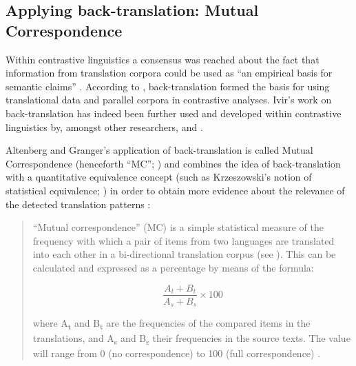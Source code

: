 \subsection{Applying back-translation: Mutual Correspondence}
\label{sec:2.3.3}  
Within contrastive linguistics a consensus was reached about the fact that information from translation corpora could be used as “an empirical basis for semantic claims” \citep[758]{noel_translations_2003}. According to \citet[24--28]{ebeling_patterns_2013}, back-translation formed the basis for using translational data and parallel corpora in contrastive analyses. Ivir’s work on back-translation has indeed been further used and developed within contrastive linguistics by, amongst other researchers, \citet{hasselgard_adverbial_1999} and \citet{altenberg_recent_2002}.

Altenberg and Granger’s application of back-translation is called Mutual Correspondence (henceforth ``MC''; \textcites[254 ff.\isdot]{hasselgard_adverbial_1999}[9]{altenberg_correspondence_2007}[7--18]{altenberg_recent_2002}) and combines the idea of back-translation with a quan\-titative equivalence concept (such as Krzeszowski’s notion of statistical equivalence; \citealp[27--28]{krzeszowski_contrasting_1990}) in order to obtain more evidence about the relevance of the detected translation patterns \citep[17]{altenberg_recent_2002}:

\begin{quote}
``Mutual correspondence'' (MC) is a simple statistical measure of the frequency with which a pair of items from two languages are translated into each other in a bi-directional translation corpus (see \citealt{hasselgard_adverbial_1999}). This can be calculated and expressed as a percentage by means of the formula:
	
$$\frac{A_t + B_t}{A_s + B_s} \times 100$$

where A\textsubscript{t} and B\textsubscript{t} are the frequencies of the compared items in the translations, and A\textsubscript{s} and B\textsubscript{s} their frequencies in the source texts. The value will range from 0 (no correspondence) to 100 (full correspondence) \citep[9]{altenberg_correspondence_2007}.
\end{quote}

